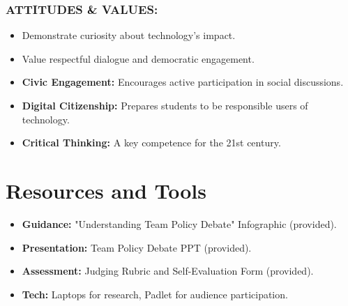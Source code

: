 \documentclass[11pt, a4paper]{article}
\begin{document}
\subsubsection*{ATTITUDES \& VALUES:}
\begin{itemize}
    \item Demonstrate curiosity about technology's impact.
    \item Value respectful dialogue and democratic engagement.
\end{itemize}

\begin{eurobox}
\begin{itemize}
    \item \textbf{Civic Engagement:} Encourages active participation in social discussions.
    \item \textbf{Digital Citizenship:} Prepares students to be responsible users of technology.
    \item \textbf{Critical Thinking:} A key competence for the 21st century.
\end{itemize}
\end{eurobox}

\newpage
\section{Resources and Tools}
\begin{itemize}
    \item \textbf{Guidance:} "Understanding Team Policy Debate" Infographic (provided).
    \item \textbf{Presentation:} Team Policy Debate PPT (provided).
    \item \textbf{Assessment:} Judging Rubric and Self-Evaluation Form (provided).
    \item \textbf{Tech:} Laptops for research, Padlet for audience participation.
\end{itemize}
\end{document}
